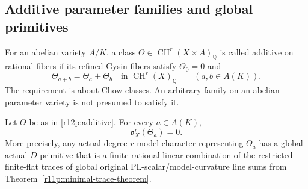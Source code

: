 \subsection{Additive parameter families and global primitives}

\begin{definition}
For an abelian variety $A/K$, a class
$\Theta\in\operatorname{CH}^r(X\times A)_{\mathbb Q}$ is called
additive on rational fibers if its refined Gysin fibers satisfy
$\Theta_0=0$ and
\[
       \Theta_{a+b}=\Theta_a+\Theta_b
       \quad\text{in }\operatorname{CH}^r(X)_{\mathbb Q}
       \qquad(a,b\in A(K)).
\tag{R12.P3}\label{r12p:additive}
\]
The requirement is about Chow classes.  An arbitrary family on an
abelian parameter variety is not presumed to satisfy it.
\end{definition}

\begin{theorem}
\label{r12p:compact-additive}
Let $\Theta$ be as in \eqref{r12p:additive}.  For every $a\in A(K)$,
\[
                          \mathfrak o_X^r(\Theta_a)=0.
\tag{R12.P4}\label{r12p:additive-zero}
\]
More precisely, any actual degree-$r$ model character representing
$\Theta_a$ has a global actual $D$-primitive that is a finite rational
linear combination of the restricted finite-flat traces of global
original PL-scalar/model-curvature line sums from Theorem~\ref{r11p:minimal-trace-theorem}.
\end{theorem}

